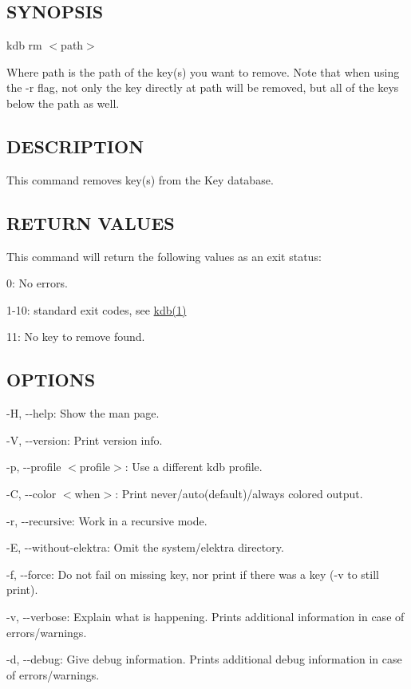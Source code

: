 \subsection*{S\+Y\+N\+O\+P\+S\+IS}

{\ttfamily kdb rm $<$path$>$}

Where {\ttfamily path} is the path of the key(s) you want to remove. Note that when using the {\ttfamily -\/r} flag, not only the key directly at {\ttfamily path} will be removed, but all of the keys below the path as well.

\subsection*{D\+E\+S\+C\+R\+I\+P\+T\+I\+ON}

This command removes key(s) from the Key database.

\subsection*{R\+E\+T\+U\+RN V\+A\+L\+U\+ES}

This command will return the following values as an exit status\+:


\begin{DoxyItemize}
\item 0\+: No errors.
\item 1-\/10\+: standard exit codes, see \hyperlink{doc_help_kdb_md}{kdb(1)}
\item 11\+: No key to remove found.
\end{DoxyItemize}

\subsection*{O\+P\+T\+I\+O\+NS}


\begin{DoxyItemize}
\item {\ttfamily -\/H}, {\ttfamily -\/-\/help}\+: Show the man page.
\item {\ttfamily -\/V}, {\ttfamily -\/-\/version}\+: Print version info.
\item {\ttfamily -\/p}, {\ttfamily -\/-\/profile $<$profile$>$}\+: Use a different kdb profile.
\item {\ttfamily -\/C}, {\ttfamily -\/-\/color $<$when$>$}\+: Print never/auto(default)/always colored output.
\item {\ttfamily -\/r}, {\ttfamily -\/-\/recursive}\+: Work in a recursive mode.
\item {\ttfamily -\/E}, {\ttfamily -\/-\/without-\/elektra}\+: Omit the {\ttfamily system/elektra} directory.
\item {\ttfamily -\/f}, {\ttfamily -\/-\/force}\+: Do not fail on missing key, nor print if there was a key (-\/v to still print).
\item {\ttfamily -\/v}, {\ttfamily -\/-\/verbose}\+: Explain what is happening. Prints additional information in case of errors/warnings.
\item {\ttfamily -\/d}, {\ttfamily -\/-\/debug}\+: Give debug information. Prints additional debug information in case of errors/warnings.
\end{DoxyItemize}

